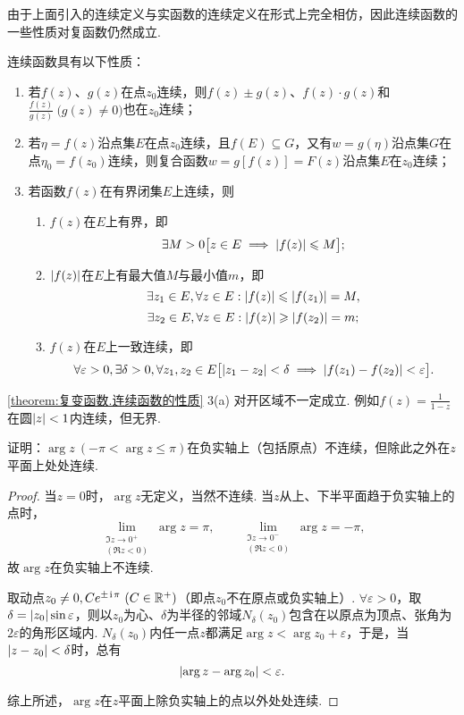 由于上面引入的连续定义与实函数的连续定义在形式上完全相仿，因此连续函数的一些性质对复函数仍然成立.
\begin{property}\label{theorem:复变函数.连续函数的性质}
连续函数具有以下性质：
\begin{enumerate}
\item 若\(f(z)\)、\(g(z)\)在点\(z_0\)连续，则\(f(z) \pm g(z)\)、\(f(z) \cdot g(z)\)和\(\frac{f(z)}{g(z)}\ \bigl(g(z) \neq 0\bigr)\)也在\(z_0\)连续；

\item 若\(\eta = f(z)\)沿点集\(E\)在点\(z_0\)连续，且\(f(E) \subseteq G\)，又有\(w=g(\eta)\)沿点集\(G\)在点\(\eta_0=f(z_0)\)连续，则复合函数\(w=g[f(z)]=F(z)\)沿点集\(E\)在\(z_0\)连续；

\item 若函数\(f(z)\)在有界闭集\(E\)上连续，则\begin{enumerate}
\item\label{theorem:复变函数.连续函数的性质.3a} \(f(z)\)在\(E\)上有界，即\[
\exists M>0 \bigl[
z \in E \implies \abs{f(z)} \leqslant M
\bigr];
\]

\item\label{theorem:复变函数.连续函数的性质.3b} \(\abs{f(z)}\)在\(E\)上有最大值\(M\)与最小值\(m\)，即\[
\exists z_1 \in E, \forall z \in E : \abs{f(z)} \leqslant \abs{f(z_1)} = M,
\]\[
\exists z_2 \in E, \forall z \in E : \abs{f(z)} \geqslant \abs{f(z_2)} = m;
\]

\item\label{theorem:复变函数.连续函数的性质.3c} \(f(z)\)在\(E\)上一致连续，即\[
\forall \varepsilon>0, \exists \delta>0, \forall z_1,z_2 \in E \bigl[
\abs{z_1-z_2}<\delta
\implies
\abs{f(z_1)-f(z_2)}<\varepsilon
\bigr].
\]
\end{enumerate}
\end{enumerate}
\end{property}
\cref{theorem:复变函数.连续函数的性质}  3(a) 对开区域不一定成立.
例如\(f(z) = \frac{1}{1-z}\)在圆\(\abs{z} < 1\)内连续，但无界.

\begin{example}
证明：\(\arg z\ (-\pi < \arg z \leqslant \pi)\)在负实轴上（包括原点）不连续，但除此之外在\(z\)平面上处处连续.
\begin{proof}
当\(z = 0\)时，\(\arg z\)无定义，当然不连续.
当\(z\)从上、下半平面趋于负实轴上的点时，\[
\lim\limits_{\substack{\Im z \to 0^+ \\ (\Re z < 0)}} \arg z = \pi,
\qquad
\lim\limits_{\substack{\Im z \to 0^- \\ (\Re z < 0)}} \arg z = -\pi,
\]故\(\arg z\)在负实轴上不连续.

取动点\(z_0\neq0,Ce^{\pm\iu\pi}\ (C\in\mathbb{R}^+)\)（即点\(z_0\)不在原点或负实轴上）.
\(\forall \varepsilon > 0\)，取\(\delta = \abs{z_0} \sin\varepsilon\)，则以\(z_0\)为心、\(\delta\)为半径的邻域\(N_{\delta}(z_0)\)包含在以原点为顶点、张角为\(2\varepsilon\)的角形区域内.
\(N_{\delta}(z_0)\)内任一点\(z\)都满足\(\arg z < \arg z_0 + \varepsilon\)，于是，当\(\abs{z - z_0} < \delta\)时，总有\[
\abs{\arg z - \arg z_0} < \varepsilon.
\]

综上所述，\(\arg z\)在\(z\)平面上除负实轴上的点以外处处连续.
\end{proof}
\end{example}

